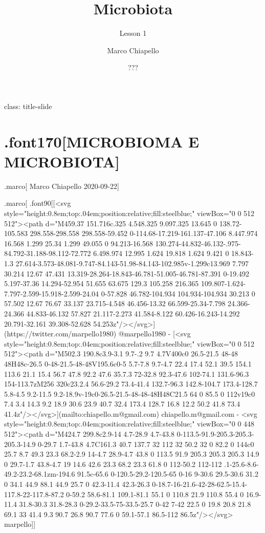 \documentclass[
]{article}
\title{Microbiota}
\subtitle{Lesson 1}
\author{Marco Chiapello}
\date{???}
\begin{document}
\maketitle

class: title-slide

\hypertarget{font170microbioma-e-microbiota}{%
\section{.font170{[}MICROBIOMA E
MICROBIOTA{]}}\label{font170microbioma-e-microbiota}}

.marco{[} Marco Chiapello 2020-09-22{]}

.marco{[} .font90{[}{[}\textless svg
style="height:0.8em;top:.04em;position:relative;fill:steelblue;"
viewBox="0 0 512 512"\textgreater\textless path d="M459.37 151.716c.325
4.548.325 9.097.325 13.645 0 138.72-105.583 298.558-298.558
298.558-59.452 0-114.68-17.219-161.137-47.106 8.447.974 16.568 1.299
25.34 1.299 49.055 0 94.213-16.568
130.274-44.832-46.132-.975-84.792-31.188-98.112-72.772 6.498.974 12.995
1.624 19.818 1.624 9.421 0 18.843-1.3
27.614-3.573-48.081-9.747-84.143-51.98-84.143-102.985v-1.299c13.969
7.797 30.214 12.67 47.431
13.319-28.264-18.843-46.781-51.005-46.781-87.391 0-19.492 5.197-37.36
14.294-52.954 51.655 63.675 129.3 105.258 216.365
109.807-1.624-7.797-2.599-15.918-2.599-24.04 0-57.828 46.782-104.934
104.934-104.934 30.213 0 57.502 12.67 76.67 33.137 23.715-4.548
46.456-13.32 66.599-25.34-7.798 24.366-24.366 44.833-46.132 57.827
21.117-2.273 41.584-8.122 60.426-16.243-14.292 20.791-32.161
39.308-52.628
54.253z"/\textgreater\textless/svg\textgreater{]}(https://twitter.com/marpello1980)
@marpello1980 - {[}\textless svg
style="height:0.8em;top:.04em;position:relative;fill:steelblue;"
viewBox="0 0 512 512"\textgreater\textless path d="M502.3 190.8c3.9-3.1
9.7-.2 9.7 4.7V400c0 26.5-21.5 48-48 48H48c-26.5
0-48-21.5-48-48V195.6c0-5 5.7-7.8 9.7-4.7 22.4 17.4 52.1 39.5 154.1
113.6 21.1 15.4 56.7 47.8 92.2 47.6 35.7.3 72-32.8 92.3-47.6 102-74.1
131.6-96.3 154-113.7zM256 320c23.2.4 56.6-29.2 73.4-41.4 132.7-96.3
142.8-104.7 173.4-128.7 5.8-4.5 9.2-11.5
9.2-18.9v-19c0-26.5-21.5-48-48-48H48C21.5 64 0 85.5 0 112v19c0 7.4 3.4
14.3 9.2 18.9 30.6 23.9 40.7 32.4 173.4 128.7 16.8 12.2 50.2 41.8 73.4
41.4z"/\textgreater\textless/svg\textgreater{]}(mailto:chiapello.m@gmail.com)
chiapello.m@gmail.com - \textless svg
style="height:0.8em;top:.04em;position:relative;fill:steelblue;"
viewBox="0 0 448 512"\textgreater\textless path d="M424.7 299.8c2.9-14
4.7-28.9 4.7-43.8 0-113.5-91.9-205.3-205.3-205.3-14.9 0-29.7 1.7-43.8
4.7C161.3 40.7 137.7 32 112 32 50.2 32 0 82.2 0 144c0 25.7 8.7 49.3 23.3
68.2-2.9 14-4.7 28.9-4.7 43.8 0 113.5 91.9 205.3 205.3 205.3 14.9 0
29.7-1.7 43.8-4.7 19 14.6 42.6 23.3 68.2 23.3 61.8 0 112-50.2 112-112
.1-25.6-8.6-49.2-23.2-68.1zm-194.6 91.5c-65.6 0-120.5-29.2-120.5-65 0-16
9-30.6 29.5-30.6 31.2 0 34.1 44.9 88.1 44.9 25.7 0 42.3-11.4 42.3-26.3
0-18.7-16-21.6-42-28-62.5-15.4-117.8-22-117.8-87.2 0-59.2 58.6-81.1
109.1-81.1 55.1 0 110.8 21.9 110.8 55.4 0 16.9-11.4 31.8-30.3 31.8-28.3
0-29.2-33.5-75-33.5-25.7 0-42 7-42 22.5 0 19.8 20.8 21.8 69.1 33 41.4
9.3 90.7 26.8 90.7 77.6 0 59.1-57.1 86.5-112
86.5z"/\textgreater\textless/svg\textgreater{} marpello{]}{]}
\end{document}
